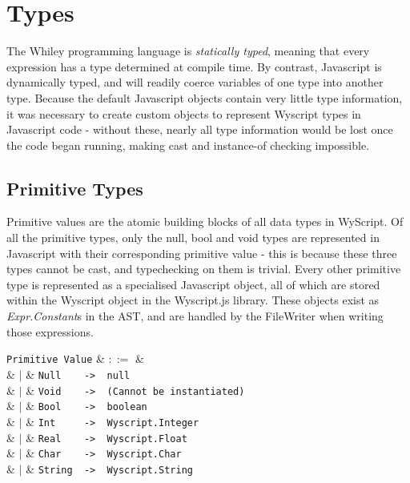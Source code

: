 \chapter{Types}
The Whiley programming language is {\em statically typed}, meaning that every expression has a type determined at compile time.  By contrast, Javascript is dynamically typed, and will readily coerce variables of one type into another type. Because the default Javascript objects contain very little type information, it was necessary to create custom objects to represent Wyscript types in Javascript code - without these, nearly all type information would be lost once the code began running, making cast and instance-of checking impossible.

\section{Primitive Types}
\label{c_types_primitive_types}

Primitive values are the atomic building blocks of all data types in WyScript. Of all the primitive types, only the null, bool and void types are represented in Javascript with their corresponding primitive value - this is because these three types cannot be cast, and typechecking on them is trivial. Every other primitive type is represented as a specialised Javascript object, all of which are stored within the Wyscript object in the Wyscript.js library. These objects exist as {\em Expr.Constant}s in the AST, and are handled by the FileWriter when writing those expressions. 

\begin{syntax}
  \verb+Primitive Value+ & $::=$ & \\
  & $|$ & \verb+Null    ->  null+\\
  & $|$ & \verb+Void    ->  (Cannot be instantiated)+\\
  & $|$ & \verb+Bool    ->  boolean+\\
  & $|$ & \verb+Int     ->  Wyscript.Integer+\\
  & $|$ & \verb+Real    ->  Wyscript.Float+\\
  & $|$ & \verb+Char    ->  Wyscript.Char+\\
  & $|$ & \verb+String  ->  Wyscript.String+\\
\end{syntax}


